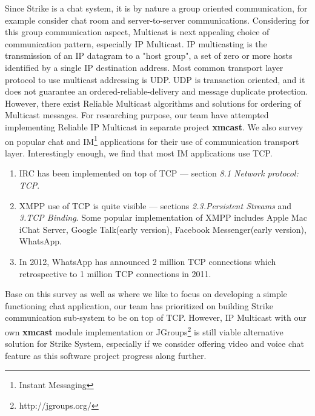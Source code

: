 \documentclass[dareport.tex]{subfiles}
\begin{document}
Since Strike is a chat system, it is by nature a group oriented communication, for example consider chat room and server-to-server communications. Considering for this group communication aspect, Multicast is next appealing choice of communication pattern, especially IP Multicast. IP multicasting is the transmission of an IP datagram to a "host group", a set of zero or more hosts identified by a single IP destination address\cite{ipmcast}. Most common transport layer protocol to use multicast addressing is UDP. UDP is transaction oriented, and it does not guarantee an ordered-reliable-delivery and message duplicate protection\cite{udp}. However, there exist Reliable Multicast algorithms and solutions for ordering of Multicast messages\cite{coulouris}. For researching purpose, our team have attempted implementing Reliable IP Multicast in separate project \textbf{xmcast}. We also survey on popular chat and IM\footnote{Instant Messaging} applications for their use of communication transport layer. Interestingly enough, we find that most IM applications use TCP. 

\begin{enumerate}[leftmargin=*]

\item IRC has been implemented on top of TCP --- \cite{irc} section \emph{8.1 Network protocol: TCP}.

\item XMPP use of TCP is quite visible --- \cite{xmpp} sections \emph{2.3.Persistent Streams} and \emph{3.TCP Binding}. Some popular implementation of XMPP includes Apple Mac iChat Server, Google Talk(early version), Facebook Messenger(early version), WhatsApp.

\item In 2012, WhatsApp has announced 2 million TCP connections which retrospective to 1 million TCP connections in 2011\cite{whatsapp}.

\end{enumerate}

Base on this survey as well as where we like to focus on developing a simple functioning chat application, our team has prioritized on building Strike communication sub-system to be on top of TCP. However, IP Multicast with our own \textbf{xmcast} module implementation or JGroups\footnote{http://jgroups.org/} is still viable alternative solution for Strike System, especially if we consider offering video and voice chat feature as this software project progress along further.
\end{document}
